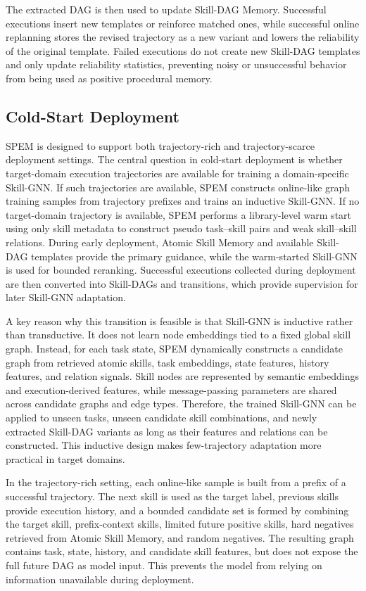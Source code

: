 \documentclass[letterpaper]{article}
\newcommand{\model}{\textsc{SPEM}}
\begin{document}
The extracted DAG is then used to update Skill-DAG Memory. Successful
executions insert new templates or reinforce matched ones, while successful
online replanning stores the revised trajectory as a new variant and lowers the
reliability of the original template. Failed executions do not create new
Skill-DAG templates and only update reliability statistics, preventing noisy or
unsuccessful behavior from being used as positive procedural memory.
\subsection{Cold-Start Deployment}

\model{} is designed to support both trajectory-rich and trajectory-scarce
deployment settings. The central question in cold-start deployment is whether
target-domain execution trajectories are available for training a
domain-specific Skill-GNN. If such trajectories are available, \model{}
constructs online-like graph training samples from trajectory prefixes and
trains an inductive Skill-GNN. If no target-domain trajectory is available,
\model{} performs a library-level warm start using only skill metadata to
construct pseudo task--skill pairs and weak skill--skill relations. During early
deployment, Atomic Skill Memory and available Skill-DAG templates provide the
primary guidance, while the warm-started Skill-GNN is used for bounded reranking.
Successful executions collected during deployment are then converted into
Skill-DAGs and transitions, which provide supervision for later Skill-GNN
adaptation.

A key reason why this transition is feasible is that Skill-GNN is inductive rather than transductive. It does not learn node embeddings tied to a fixed global skill graph. Instead, for each task state, \model{} dynamically constructs a candidate graph from retrieved atomic skills, task embeddings, state features, history features, and relation signals. Skill nodes are represented by semantic embeddings and execution-derived features, while message-passing parameters are shared across candidate graphs and edge types. Therefore, the trained Skill-GNN can be applied to unseen tasks, unseen candidate skill combinations, and newly extracted Skill-DAG variants as long as their features and relations can be constructed. This inductive design makes few-trajectory adaptation more practical in target domains.

In the trajectory-rich setting, each online-like sample is built from a prefix of a successful trajectory. The next skill is used as the target label, previous skills provide execution history, and a bounded candidate set is formed by combining the target skill, prefix-context skills, limited future positive skills, hard negatives retrieved from Atomic Skill Memory, and random negatives. The resulting graph contains task, state, history, and candidate skill features, but does not expose the full future DAG as model input. This prevents the model from relying on information unavailable during deployment.
\end{document}

